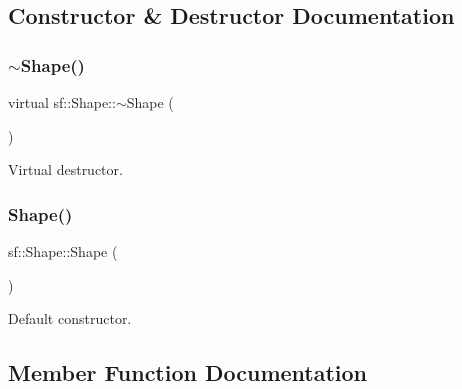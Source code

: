 \subsection{Constructor \& Destructor Documentation}
\mbox{\label{classsf_1_1_shape_a2262aceb9df52d4275c19633592f19bf}} 
\subsubsection{\texorpdfstring{$\sim$Shape()}{~Shape()}}
{\footnotesize\ttfamily virtual sf\+::\+Shape\+::$\sim$\+Shape (\begin{DoxyParamCaption}{ }\end{DoxyParamCaption})\hspace{0.3cm}{\ttfamily [virtual]}}



Virtual destructor. 

\begin{DoxyVerb}\end{DoxyVerb}
 \mbox{\label{classsf_1_1_shape_a413a457f720835b9f5d8e97ca8b80960}} 
\subsubsection{\texorpdfstring{Shape()}{Shape()}}
{\footnotesize\ttfamily sf\+::\+Shape\+::\+Shape (\begin{DoxyParamCaption}{ }\end{DoxyParamCaption})\hspace{0.3cm}{\ttfamily [protected]}}



Default constructor. 

\begin{DoxyVerb}\end{DoxyVerb}
 

\subsection{Member Function Documentation}
\mbox{\label{classsf_1_1_shape_af335b88097f1db83afdfafa0cd66d04d}} 
